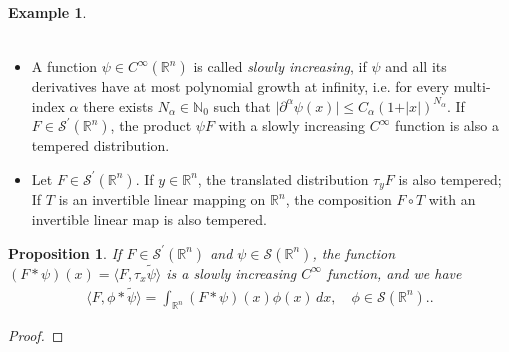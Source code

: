 \documentclass{article}
\numberwithin{equation}{section}
\newcommand{\bbN}{\mathbb{N}}
\newcommand{\bbR}{\mathbb{R}}
\renewcommand{\cal}{\mathcal}
\newcommand{\wt}{\widetilde}
\theoremstyle{plain}
\newtheorem{proposition}[theorem]{Proposition}
\theoremstyle{definition}
\newtheorem{example}[theorem]{Example}
\begin{document}
\begin{example}
\begin{itemize}
\begin{align*}
\end{align*}
\item A function $\psi\in C^\infty(\bbR^n)$ is called \textit{slowly increasing}, if $\psi$ and all its derivatives have at most polynomial growth at infinity, i.e. for every multi-index $\alpha$ there exists $N_\alpha\in\bbN_0$ such that $\vert\partial^\alpha\psi(x)\vert\leq C_\alpha(1+\vert x\vert)^{N_\alpha}$. If $F\in\cal{S}^\prime(\bbR^n)$, the product $\psi F$ with a slowly increasing $C^\infty$ function is also a tempered distribution.
\item Let $F\in\cal{S}^\prime(\bbR^n)$. If $y\in\bbR^n$, the translated distribution $\tau_y F$ is also tempered; If $T$ is an invertible linear mapping on $\bbR^n$, the composition $F\circ T$ with an invertible linear map is also tempered.
\end{itemize}
\end{example}

\newpage
\begin{proposition}
If $F\in\cal{S}^\prime(\bbR^n)$ and $\psi\in\cal{S}(\bbR^n)$, the function $(F*\psi)(x)=\langle F,\tau_x\wt\psi\rangle$ is a slowly increasing $C^\infty$ function, and we have
\begin{align*}
	\langle F,\phi*\wt\psi\rangle = \int_{\bbR^n}(F*\psi)(x)\phi(x)\,dx,\quad\phi\in\cal{S}(\bbR^n)..
\end{align*}
\end{proposition}
\begin{proof}

\end{proof}
\end{document}
